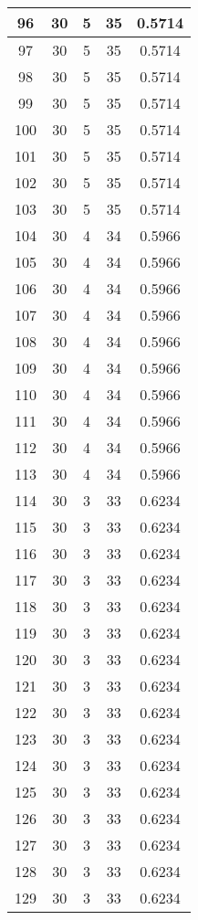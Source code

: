 \documentclass[letterpaper, 12pt]{article}
\begin{document}
\begin{longtable}{|c|c|c|c|c|}
\hline
96 & 30 & 5 & 35 & 0.5714 \\
\hline
97 & 30 & 5 & 35 & 0.5714 \\
\hline
98 & 30 & 5 & 35 & 0.5714 \\
\hline
99 & 30 & 5 & 35 & 0.5714 \\
\hline
100 & 30 & 5 & 35 & 0.5714 \\
\hline
101 & 30 & 5 & 35 & 0.5714 \\
\hline
102 & 30 & 5 & 35 & 0.5714 \\
\hline
103 & 30 & 5 & 35 & 0.5714 \\
\hline
104 & 30 & 4 & 34 & 0.5966 \\
\hline
105 & 30 & 4 & 34 & 0.5966 \\
\hline
106 & 30 & 4 & 34 & 0.5966 \\
\hline
107 & 30 & 4 & 34 & 0.5966 \\
\hline
108 & 30 & 4 & 34 & 0.5966 \\
\hline
109 & 30 & 4 & 34 & 0.5966 \\
\hline
110 & 30 & 4 & 34 & 0.5966 \\
\hline
111 & 30 & 4 & 34 & 0.5966 \\
\hline
112 & 30 & 4 & 34 & 0.5966 \\
\hline
113 & 30 & 4 & 34 & 0.5966 \\
\hline
114 & 30 & 3 & 33 & 0.6234 \\
\hline
115 & 30 & 3 & 33 & 0.6234 \\
\hline
116 & 30 & 3 & 33 & 0.6234 \\
\hline
117 & 30 & 3 & 33 & 0.6234 \\
\hline
118 & 30 & 3 & 33 & 0.6234 \\
\hline
119 & 30 & 3 & 33 & 0.6234 \\
\hline
120 & 30 & 3 & 33 & 0.6234 \\
\hline
121 & 30 & 3 & 33 & 0.6234 \\
\hline
122 & 30 & 3 & 33 & 0.6234 \\
\hline
123 & 30 & 3 & 33 & 0.6234 \\
\hline
124 & 30 & 3 & 33 & 0.6234 \\
\hline
125 & 30 & 3 & 33 & 0.6234 \\
\hline
126 & 30 & 3 & 33 & 0.6234 \\
\hline
127 & 30 & 3 & 33 & 0.6234 \\
\hline
128 & 30 & 3 & 33 & 0.6234 \\
\hline
129 & 30 & 3 & 33 & 0.6234 \\

\end{longtable}
\end{document}
